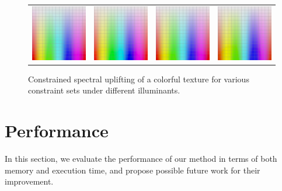 \begin{figure}[ht]
{\begin{tabular}{cccc}
			\includegraphics[width=.22\linewidth]{img/gradient_complete_pantoneD75.jpg}
			&
			\includegraphics[width=.22\linewidth]{img/gradient_complete_noneFL9.jpg}
			& 
			\includegraphics[width=.22\linewidth]{img/gradient_complete_ralFL7.jpg}
			& 
			\includegraphics[width=.22\linewidth]{img/gradient_complete_mccSGFL3.jpg}\\
		\end{tabular}
	}
	\caption{Constrained spectral uplifting of a colorful texture for various constraint sets under different illuminants.}
	\label{fig:uplift_colourful_texture}
	\vspace{-1em}
\end{figure}


\section{Performance}

In this section, we evaluate the performance of our method in terms of both memory and execution time, and propose possible future work for their improvement.

